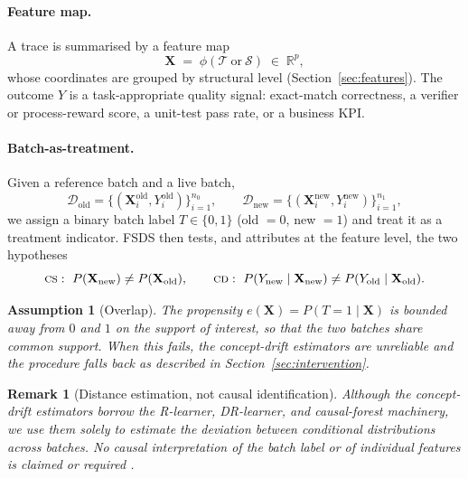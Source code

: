 \documentclass[11pt]{article}
\newtheorem{assumption}{Assumption}
\newtheorem{remark}{Remark}
\newcommand{\Dold}{\mathcal{D}_{\mathrm{old}}}
\newcommand{\Dnew}{\mathcal{D}_{\mathrm{new}}}
\newcommand{\X}{\mathbf{X}}
\newcommand{\CS}{\textsc{cs}}
\newcommand{\CD}{\textsc{cd}}
\begin{document}
\paragraph{Feature map.} A trace is summarised by a feature map
\begin{equation}
  \X \;=\; \phi(\mathcal{T}\ \text{or}\ \mathcal{S}) \;\in\; \mathbb{R}^p,
  \label{eq:featuremap}
\end{equation}
whose coordinates are grouped by structural level (Section~\ref{sec:features}).
The outcome $Y$ is a task-appropriate quality signal: exact-match correctness, a
verifier or process-reward score, a unit-test pass rate, or a business KPI.

\paragraph{Batch-as-treatment.} Given a reference batch and a live batch,
\begin{equation}
  \Dold=\{(\X_i^{\mathrm{old}},Y_i^{\mathrm{old}})\}_{i=1}^{n_0}, \qquad
  \Dnew=\{(\X_i^{\mathrm{new}},Y_i^{\mathrm{new}})\}_{i=1}^{n_1},
\end{equation}
we assign a binary batch label $T\in\{0,1\}$ (old $=0$, new $=1$) and treat it as
a treatment indicator. FSDS then tests, and attributes at the feature level, the
two hypotheses
\begin{equation}
  \CS:\ P(\X_{\mathrm{new}})\neq P(\X_{\mathrm{old}}),
  \qquad
  \CD:\ P(Y_{\mathrm{new}}\mid\X_{\mathrm{new}})\neq P(Y_{\mathrm{old}}\mid\X_{\mathrm{old}}).
\end{equation}

\begin{assumption}[Overlap]
\label{ass:overlap}
The propensity $e(\X)=P(T=1\mid\X)$ is bounded away from $0$ and $1$ on the
support of interest, so that the two batches share common support. When this
fails, the concept-drift estimators are unreliable and the procedure falls back
as described in Section~\ref{sec:intervention}.
\end{assumption}

\begin{remark}[Distance estimation, not causal identification]
\label{rem:distance}
Although the concept-drift estimators borrow the R-learner, DR-learner, and
causal-forest machinery, we use them solely to estimate the deviation between
conditional distributions across batches. No causal interpretation of the batch
label or of individual features is claimed or required
\cite{fsds2026,nie2021rlearner,kennedy2023drlearner}.
\end{remark}
\end{document}

